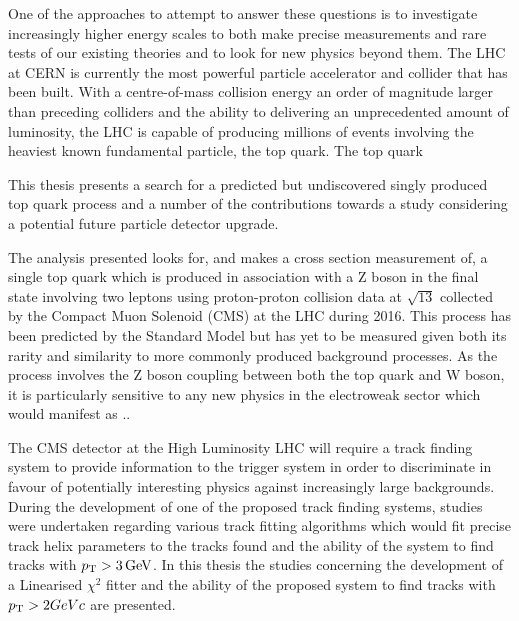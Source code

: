 One of the approaches to attempt to answer these questions is to investigate increasingly higher energy scales to both make precise measurements and rare tests of our existing theories and to look for new physics beyond them.
The LHC at CERN is currently the most powerful particle accelerator and collider that has been built.
With a centre-of-mass collision energy an order of magnitude larger than preceding colliders and the ability to delivering an unprecedented amount of luminosity, the LHC is capable of producing millions of events involving the heaviest known fundamental particle, the top quark.
The top quark 



This thesis presents a search for a predicted but undiscovered singly produced top quark process and a number of the contributions towards a study considering a potential future particle detector upgrade.

The analysis presented looks for, and makes a cross section measurement of, a single top quark which is produced in association with a Z boson in the final state involving two leptons using proton-proton collision data at $\sqrt{13}$ collected by the Compact Muon Solenoid (CMS) at the LHC during 2016.
This process has been predicted by the Standard Model but has yet to be measured given both its rarity and similarity to more commonly produced background processes.
As the process involves the Z boson coupling between both the top quark and W boson, it is particularly sensitive to any new physics in the electroweak sector which would manifest as ..

The CMS detector at the High Luminosity LHC will require a track finding system to provide information to the trigger system in order to discriminate in favour of potentially interesting physics against increasingly large backgrounds.
During the development of one of the proposed track finding systems, studies were undertaken regarding various track fitting algorithms which would fit precise track helix parameters to the tracks found and the ability of the system to find tracks with $p_{\mathrm{T}} > 3\,\text{Ge\hspace{-.08em}V}$.
In this thesis the studies concerning the development of a Linearised $\chi^{2}$ fitter and the ability of the proposed system to find tracks with $p_{\mathrm{T}} > 2GeVc$ are presented.



